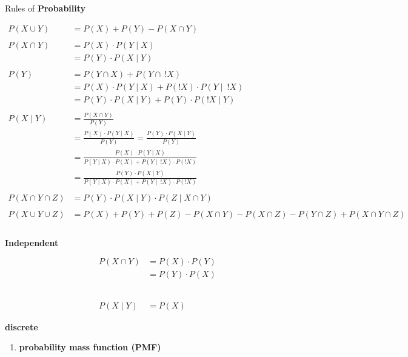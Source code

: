 \documentclass{article}
\begin{document}
\begin{small}


Rules of \textbf{Probability}

\begin{multicols}{2}
\begin{align*}
P(X \cup Y) & = P(X) + P(Y) - P(X \cap Y) \\\\
P(X \cap Y) & = P(X) \cdot P(Y \mid X) \\
            & = P(Y) \cdot P(X \mid Y) \\\\
P(Y)        & = P(Y \cap X) + P(Y \cap \ !X) \\
            & = P(X) \cdot P(Y \mid X) + P(!X) \cdot P(Y \mid \ !X) \\
            & = P(Y) \cdot P(X \mid Y) + P(Y) \cdot P(!X \mid Y) \\\\
P(X \mid Y) & = \frac{P(X \cap Y)}{P(Y)} \\
            & = \frac{P(X) \cdot P(Y \mid X)}{P(Y)} = \frac{P(Y) \cdot P(X \mid Y)}{P(Y)} \\
            & = \frac{P(X) \cdot P(Y \mid X)}{P(Y \mid X) \cdot P(X) + P(Y \mid \ !X) \cdot P(!X)} \\
            & = \frac{P(Y) \cdot P(X \mid Y)}{P(Y \mid X) \cdot P(X) + P(Y \mid \ !X) \cdot P(!X)}\\\\
P(X \cap Y \cap Z) & = P(Y) \cdot P(X \mid Y) \cdot P(Z \mid X \cap Y)\\\\
P(X \cup Y \cup Z) & = P(X) + P(Y) + P(Z) - P(X \cap Y) - P(X \cap Z) - P(Y \cap Z) + P(X \cap Y \cap Z) \\\\
\end{align*}

\columnbreak
\textbf{Independent}
\begin{align*}
\\\\
P(X \cap Y) & = P(X) \cdot P(Y) \\
            & = P(Y) \cdot P(X) \\\\
\\\\\\\\
P(X \mid Y) & = P(X) 
\end{align*}
\end{multicols}
\begin{multicols}{2}
\textbf{discrete}
\begin{enumerate}
\item\textbf{probability mass function (PMF)}


\end{enumerate}
\end{multicols}
\end{small}
\end{document}
